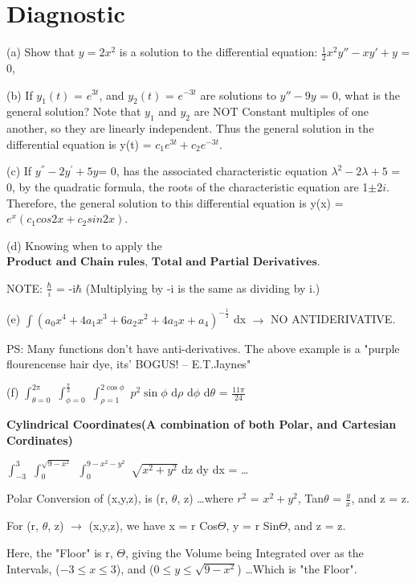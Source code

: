 \documentclass[a4paper, 10pt, onepage]{elegantbook}
\begin{document}
\section{Diagnostic}

(a) Show that $y = 2x^2$ is a solution to the differential equation: $\frac{1}{2}x^2y''-xy'+y$ = 0,

(b) If $y_1(t)$ = $e^{3t}$, and $y_2(t)$ = $e^{-3t}$ are solutions to $y'' - 9y$ = 0, what is the general solution? 
Note that $y_1$ and
$y_2$ are NOT Constant multiples of one another, so they are linearly independent. Thus the general solution in the 
differential equation is
y(t) = $c_1e^{3t} + c_2e^{-3t}$.

(c) If $y^{''} - 2y^{'} + 5y $= 0, has the associated characteristic equation $\lambda^2 - 2\lambda + 5$ = 0,
by the quadratic formula, the roots of the characteristic equation are 1$\pm 2{i}$.
Therefore, the general solution to this differential equation is y(x) = $e^x(c_1cos2{x}+c_2sin2{x})$.

(d) Knowing when to apply the $\mathbf{\textbf{Product and Chain rules, Total and Partial Derivatives}}$.

NOTE: $\frac{\hbar}{i}$ = -i$\hbar$ (Multiplying by -i is the same as dividing by i.)

(e) $\int (a_0 x^4 + 4a_1 x^3 + 6a_2 x^2 + 4a_3 x + a_4)^{- \frac{1}{2}}$ dx $\rightarrow$ NO ANTIDERIVATIVE.

PS: Many functions don't have anti-derivatives. The above example is a "purple flourencense hair dye, its' BOGUS! -- 
E.T.Jaynes"

(f) $\int_{\theta=0}^{2 \pi}$ $\int_{\phi=0}^{\frac{\pi}{3}}$ $\int_{\rho=1}^{2 \cos \phi}$ $p^2 \sin \phi$ d$\rho$ 
d$\phi$ d$\theta$ = $\frac{11 \pi}{24}$

    \textbf{Cylindrical Coordinates(A combination of both Polar, and Cartesian Cordinates)}

$\int_{-3}^{3}$ $\int_{0}^{\sqrt{9 - x^2}}$ $\int_{0}^{9 - x^2 - y^2}$ $\sqrt{x^2 + y^2}$ dz dy dx = \ldots

Polar Conversion of (x,y,z), is (r, $\theta$, z) \ldots where $r^2$ = $x^2 + y^2$, Tan$\theta$ = $\frac{y}{x}$, and z = 
z.

For (r, $\theta$, z) $\to$ (x,y,z), we have x = r Cos$\Theta$, y = r Sin$\Theta$, and z = z.

Here, the "Floor" is r, $\Theta$, giving the Volume being Integrated over as the Intervals, ($-3 \leq x \leq 3$), and 
($0 \leq y \leq \sqrt{9 - x^2}$) \ldots Which is "the Floor".
\end{document}
